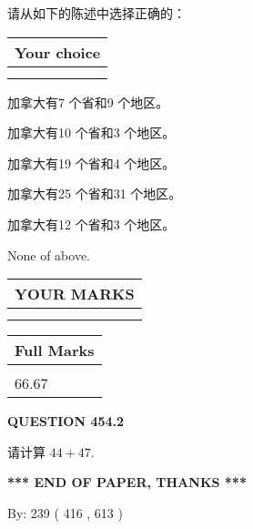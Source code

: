\documentclass{ctexart}
\begin{document}
  
请从如下的陈述中选择正确的：
  
  
\noindent\hspace{3.0in} \begin{tabular}{|l|}
\hline
Your choice \\
\hline
 \\ 
 \\ 
\hline
\end{tabular}
  
  
 
 
加拿大有7 个省和9 个地区。
 
 
加拿大有10 个省和3 个地区。
 
 
加拿大有19 个省和4 个地区。
 
 
加拿大有25 个省和31 个地区。
 
 
加拿大有12 个省和3 个地区。
 
 
 None of above.
 
 
  
\vspace{0.2in}
  
\noindent\begin{tabular}{|l|}
\hline
 YOUR MARKS  \\
\hline
 \\ 
 \\ 
\hline
\end{tabular}
\hspace{0.05in} \begin{tabular}{|l|}
\hline
 Full Marks  \\
\hline
 \\ 
66.67 \\
\hline
\end{tabular}
{\textbf{\Large{QUESTION
454.2 
}}}
  
  
 
请计算 $ %
44 +  %
47 $.
 

 

 
   
   
 \vspace{0.2in}
 
   
   
   
   
\vspace{1.0in} 
{\textbf{\large{ *** END OF PAPER, THANKS *** }}} 
   
   
\hspace{1.0in} By: 
 239 ( 416 ,  613 )
   
\end{document}
